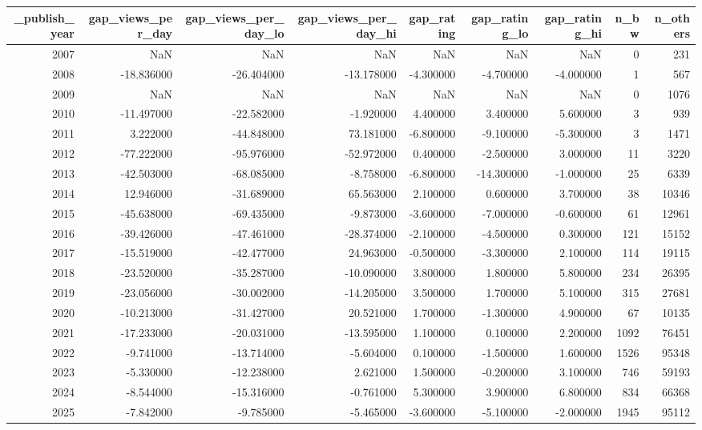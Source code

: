 \begin{tabular}{rrrrrrrrr}
\toprule
_publish_year & gap_views_per_day & gap_views_per_day_lo & gap_views_per_day_hi & gap_rating & gap_rating_lo & gap_rating_hi & n_bw & n_others \\
\midrule
2007 & NaN & NaN & NaN & NaN & NaN & NaN & 0 & 231 \\
2008 & -18.836000 & -26.404000 & -13.178000 & -4.300000 & -4.700000 & -4.000000 & 1 & 567 \\
2009 & NaN & NaN & NaN & NaN & NaN & NaN & 0 & 1076 \\
2010 & -11.497000 & -22.582000 & -1.920000 & 4.400000 & 3.400000 & 5.600000 & 3 & 939 \\
2011 & 3.222000 & -44.848000 & 73.181000 & -6.800000 & -9.100000 & -5.300000 & 3 & 1471 \\
2012 & -77.222000 & -95.976000 & -52.972000 & 0.400000 & -2.500000 & 3.000000 & 11 & 3220 \\
2013 & -42.503000 & -68.085000 & -8.758000 & -6.800000 & -14.300000 & -1.000000 & 25 & 6339 \\
2014 & 12.946000 & -31.689000 & 65.563000 & 2.100000 & 0.600000 & 3.700000 & 38 & 10346 \\
2015 & -45.638000 & -69.435000 & -9.873000 & -3.600000 & -7.000000 & -0.600000 & 61 & 12961 \\
2016 & -39.426000 & -47.461000 & -28.374000 & -2.100000 & -4.500000 & 0.300000 & 121 & 15152 \\
2017 & -15.519000 & -42.477000 & 24.963000 & -0.500000 & -3.300000 & 2.100000 & 114 & 19115 \\
2018 & -23.520000 & -35.287000 & -10.090000 & 3.800000 & 1.800000 & 5.800000 & 234 & 26395 \\
2019 & -23.056000 & -30.002000 & -14.205000 & 3.500000 & 1.700000 & 5.100000 & 315 & 27681 \\
2020 & -10.213000 & -31.427000 & 20.521000 & 1.700000 & -1.300000 & 4.900000 & 67 & 10135 \\
2021 & -17.233000 & -20.031000 & -13.595000 & 1.100000 & 0.100000 & 2.200000 & 1092 & 76451 \\
2022 & -9.741000 & -13.714000 & -5.604000 & 0.100000 & -1.500000 & 1.600000 & 1526 & 95348 \\
2023 & -5.330000 & -12.238000 & 2.621000 & 1.500000 & -0.200000 & 3.100000 & 746 & 59193 \\
2024 & -8.544000 & -15.316000 & -0.761000 & 5.300000 & 3.900000 & 6.800000 & 834 & 66368 \\
2025 & -7.842000 & -9.785000 & -5.465000 & -3.600000 & -5.100000 & -2.000000 & 1945 & 95112 \\
\bottomrule
\end{tabular}

